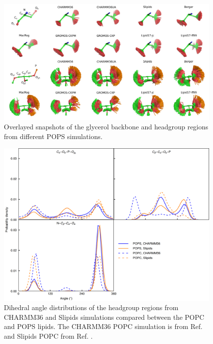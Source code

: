 \documentclass[journal=jpcbfk]{achemso}
\begin{document}
\begin{figure}[]
  \centering
  \includegraphics[width=18.0cm]{../Figs/figS8.png}
  \caption{\label{HGandGLYstructuresPS}
    Overlayed snapshots of the glycerol backbone and headgroup regions from different POPS simulations.
  }
\end{figure}

\begin{figure}[]
  \centering
  \includegraphics[width=16.0cm]{../Figs/figS11.png}
  \caption{\label{dihedralsHGpc}
    Dihedral angle distributions of the headgroup regions from CHARMM36 and Slipids simulations
    compared between the POPC and POPS lipids. 
    The CHARMM36 POPC simulation is from Ref.  and Slipids POPC from Ref. .
  }
\end{figure}
\end{document}

